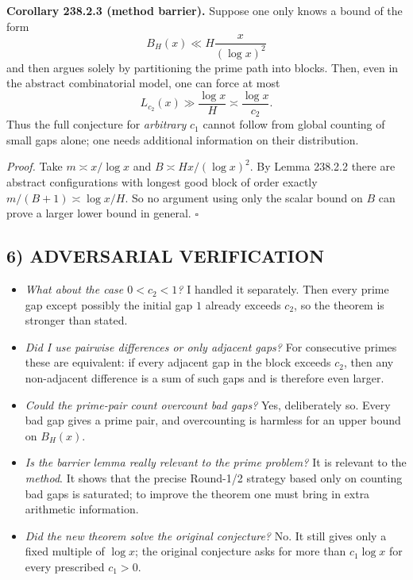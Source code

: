 \noindent
\textbf{Corollary 238.2.3 (method barrier).}
Suppose one only knows a bound of the form
\[
B_H(x)\ll H\frac{x}{(\log x)^2}
\]
and then argues solely by partitioning the prime path into blocks. Then, even in the abstract combinatorial model, one can force at most
\[
L_{c_2}(x)\gg \frac{\log x}{H}
\asymp \frac{\log x}{c_2}.
\]
Thus the full conjecture for \emph{arbitrary} $c_1$ cannot follow from global counting of small gaps alone; one needs additional information on their distribution.

\emph{Proof.}
Take $m\asymp x/\log x$ and $B\asymp Hx/(\log x)^2$. By Lemma 238.2.2 there are abstract configurations with longest good block of order exactly $m/(B+1)\asymp \log x/H$. So no argument using only the scalar bound on $B$ can prove a larger lower bound in general.
\hfill$\square$

\subsection*{6) ADVERSARIAL VERIFICATION}

\begin{itemize}
\item \emph{What about the case $0<c_2<1$?} I handled it separately. Then every prime gap except possibly the initial gap $1$ already exceeds $c_2$, so the theorem is stronger than stated.

\item \emph{Did I use pairwise differences or only adjacent gaps?} For consecutive primes these are equivalent: if every adjacent gap in the block exceeds $c_2$, then any non-adjacent difference is a sum of such gaps and is therefore even larger.

\item \emph{Could the prime-pair count overcount bad gaps?} Yes, deliberately so. Every bad gap gives a prime pair, and overcounting is harmless for an upper bound on $B_H(x)$.

\item \emph{Is the barrier lemma really relevant to the prime problem?} It is relevant to the \emph{method}. It shows that the precise Round-1/2 strategy based only on counting bad gaps is saturated; to improve the theorem one must bring in extra arithmetic information.

\item \emph{Did the new theorem solve the original conjecture?} No. It still gives only a fixed multiple of $\log x$; the original conjecture asks for more than $c_1\log x$ for every prescribed $c_1>0$.
\end{itemize}

